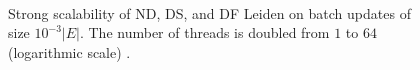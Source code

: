 \begin{figure}[hbtp]
  \centering
   \\[-1ex]
  \caption{Strong scalability of ND, DS, and DF Leiden on batch updates of size $10^{-3} |E|$. The number of threads is doubled from $1$ to $64$ (logarithmic scale) .}
  \label{fig:8020-scaling}
\end{figure}
